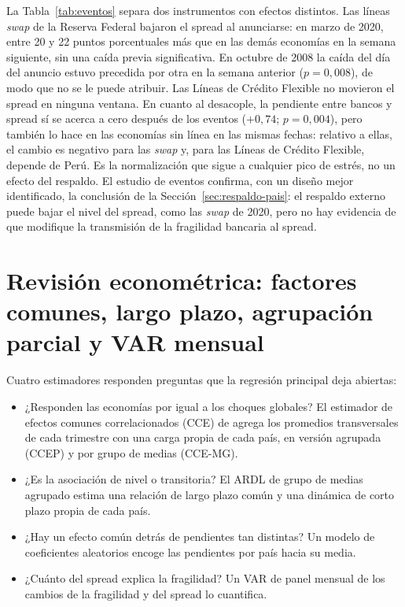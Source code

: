 La Tabla~\ref{tab:eventos} separa dos instrumentos con efectos distintos. Las líneas \textit{swap} de la Reserva Federal bajaron el spread al anunciarse: en marzo de 2020, entre 20 y 22 puntos porcentuales más que en las demás economías en la semana siguiente, sin una caída previa significativa. En octubre de 2008 la caída del día del anuncio estuvo precedida por otra en la semana anterior ($p=0{,}008$), de modo que no se le puede atribuir. Las Líneas de Crédito Flexible no movieron el spread en ninguna ventana. En cuanto al desacople, la pendiente entre bancos y spread sí se acerca a cero después de los eventos ($+0{,}74$; $p=0{,}004$), pero también lo hace en las economías sin línea en las mismas fechas: relativo a ellas, el cambio es negativo para las \textit{swap} y, para las Líneas de Crédito Flexible, depende de Perú. Es la normalización que sigue a cualquier pico de estrés, no un efecto del respaldo. El estudio de eventos confirma, con un diseño mejor identificado, la conclusión de la Sección~\ref{sec:respaldo-pais}: el respaldo externo puede bajar el nivel del spread, como las \textit{swap} de 2020, pero no hay evidencia de que modifique la transmisión de la fragilidad bancaria al spread.

\section{Revisión econométrica: factores comunes, largo plazo, agrupación parcial y VAR mensual}
\label{sec:revision-econometrica}

Cuatro estimadores responden preguntas que la regresión principal deja abiertas:
\begin{itemize}
    \item ¿Responden las economías por igual a los choques globales? El estimador de efectos comunes correlacionados (CCE) de \citet{Pesaran2006} agrega los promedios transversales de cada trimestre con una carga propia de cada país, en versión agrupada (CCEP) y por grupo de medias (CCE-MG).
    \item ¿Es la asociación de nivel o transitoria? El ARDL de grupo de medias agrupado \citep[PMG;][]{PesaranShinSmith1999} estima una relación de largo plazo común y una dinámica de corto plazo propia de cada país.
    \item ¿Hay un efecto común detrás de pendientes tan distintas? Un modelo de coeficientes aleatorios encoge las pendientes por país hacia su media.
    \item ¿Cuánto del spread explica la fragilidad? Un VAR de panel mensual de los cambios de la fragilidad y del spread lo cuantifica.
\end{itemize}

